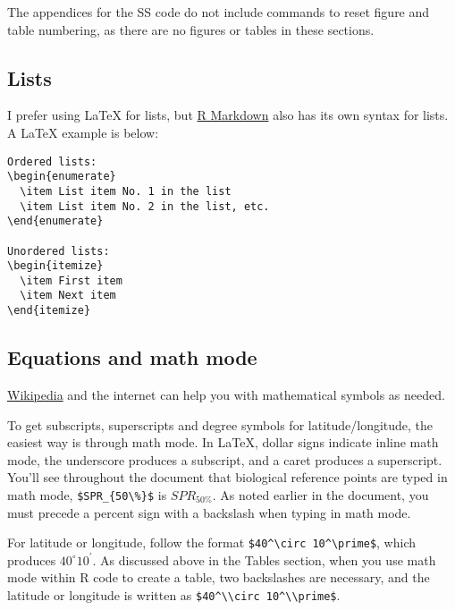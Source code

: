 \documentclass[12pt,]{article}
\begin{document}
\vspace{.5cm}

The appendices for the SS code do not include commands to reset figure
and table numbering, as there are no figures or tables in these
sections.

\subsection{Lists}\label{lists}

I prefer using LaTeX for lists, but
\href{http://rmarkdown.rstudio.com/authoring_basics.html}{R Markdown}
also has its own syntax for lists. A LaTeX example is below:

\begin{Verbatim}[frame=single]
Ordered lists:
\begin{enumerate}
  \item List item No. 1 in the list
  \item List item No. 2 in the list, etc.
\end{enumerate} 

Unordered lists:
\begin{itemize}
  \item First item
  \item Next item
\end{itemize} 
\end{Verbatim}

\subsection{Equations and math mode}\label{equations-and-math-mode}

\href{https://en.wikibooks.org/wiki/LaTeX/Mathematics}{Wikipedia} and
the internet can help you with mathematical symbols as needed.

To get subscripts, superscripts and degree symbols for
latitude/longitude, the easiest way is through math mode. In LaTeX,
dollar signs indicate inline math mode, the underscore produces a
subscript, and a caret produces a superscript. You'll see throughout the
document that biological reference points are typed in math mode,
\verb|$SPR_{50\%}$| is \(SPR_{50\%}\). As noted earlier in the document,
you must precede a percent sign with a backslash when typing in math
mode.

For latitude or longitude, follow the format
\verb|$40^\circ 10^\prime$|, which produces \(40^\circ 10^\prime\). As
discussed above in the Tables section, when you use math mode within R
code to create a table, two backslashes are necessary, and the latitude
or longitude is written as \verb|$40^\\circ 10^\\prime$|.
\end{document}
